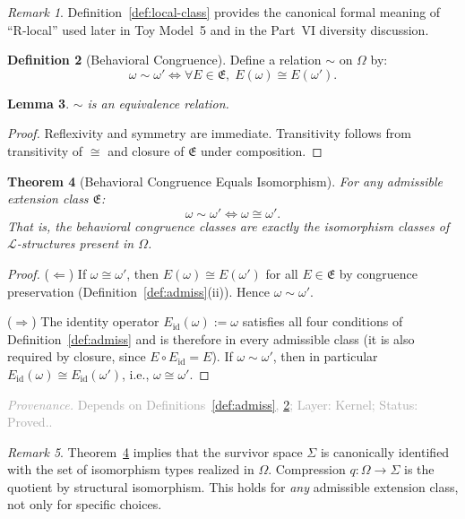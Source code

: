 \documentclass[11pt,a4paper]{article}
\newtheorem{theorem}{Theorem}[section]
\newtheorem{lemma}[theorem]{Lemma}
\theoremstyle{definition}
\newtheorem{definition}[theorem]{Definition}
\theoremstyle{remark}
\newtheorem{remark}[theorem]{Remark}
\newcommand{\assumptionfooter}[3]{%
  \par\smallskip\noindent\textcolor{darkgray}{\footnotesize\textit{Provenance.} Depends on #1; Layer: #2; Status: #3.}\par\medskip
}
\begin{document}
\begin{remark}
Definition~\ref{def:local-class} provides the canonical formal meaning of ``R-local'' used later in Toy Model~5 and in the Part~VI diversity discussion.
\end{remark}

\begin{definition}[Behavioral Congruence]\label{def:behav}
Define a relation $\sim$ on $\Omega$ by:
\[
  \omega \sim \omega' \iff \forall E \in \mathfrak{E},\; E(\omega) \cong E(\omega').
\]
\end{definition}

\begin{lemma}\label{lem:equiv}
$\sim$ is an equivalence relation.
\end{lemma}
\begin{proof}
Reflexivity and symmetry are immediate. Transitivity follows from transitivity of $\cong$ and closure of $\mathfrak{E}$ under composition.
\end{proof}

\begin{theorem}[Behavioral Congruence Equals Isomorphism]\label{thm:behav-iso}
For any admissible extension class $\mathfrak{E}$:
\[
  \omega \sim \omega' \iff \omega \cong \omega'.
\]
That is, the behavioral congruence classes are exactly the isomorphism classes of $\mathcal{L}$-structures present in $\Omega$.
\end{theorem}
\begin{proof}
($\Leftarrow$) If $\omega \cong \omega'$, then $E(\omega) \cong E(\omega')$ for all $E \in \mathfrak{E}$ by congruence preservation (Definition~\ref{def:admiss}(ii)). Hence $\omega \sim \omega'$.

($\Rightarrow$) The identity operator $E_{\mathrm{id}}(\omega) := \omega$ satisfies all four conditions of Definition~\ref{def:admiss} and is therefore in every admissible class (it is also required by closure, since $E \circ E_{\mathrm{id}} = E$). If $\omega \sim \omega'$, then in particular $E_{\mathrm{id}}(\omega) \cong E_{\mathrm{id}}(\omega')$, i.e., $\omega \cong \omega'$.
\end{proof}
\assumptionfooter{Definitions~\ref{def:admiss}, \ref{def:behav}}{Kernel}{Proved.}

\begin{remark}\label{rem:survivor-iso}
Theorem~\ref{thm:behav-iso} implies that the survivor space $\Sigma$ is canonically identified with the set of isomorphism types realized in $\Omega$. Compression $q \colon \Omega \to \Sigma$ is the quotient by structural isomorphism. This holds for \emph{any} admissible extension class, not only for specific choices.
\end{remark}
\end{document}
